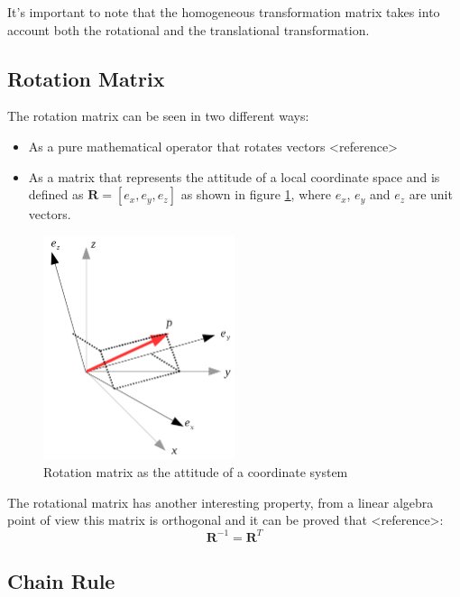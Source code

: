 \documentclass[a4paper]{report}
\begin{document}
It's important to note that the homogeneous transformation matrix takes into
account both the rotational and the translational transformation.


\subsection{Rotation Matrix}
The rotation matrix can be seen in two different ways:
\begin{itemize}
    \item{} As a pure mathematical operator that rotates vectors <reference>
    \item{} As a matrix that represents the attitude of a local coordinate space
        and is defined as $\boldsymbol{R} = [e_x, e_y, e_z]$ as shown in figure
        \ref{fig:rotation_matrix}, where $e_x$, $e_y$ and $e_z$ are unit vectors.
\end{itemize}

\begin{figure}[htb!]
\begin{center}
    \includegraphics[width=0.5\textwidth]{./resources/rotation_matrix.png}
    \caption{Rotation matrix as the attitude of a coordinate system}
    \label{fig:rotation_matrix}
\end{center}
\end{figure}

The rotational matrix has another interesting property, from a linear algebra
point of view this matrix is orthogonal and it can be proved that <reference>:
\begin{equation}
    \boldsymbol{R}^{-1} = \boldsymbol{R}^{T}
\end{equation}

\subsection{Chain Rule}
\end{document}
